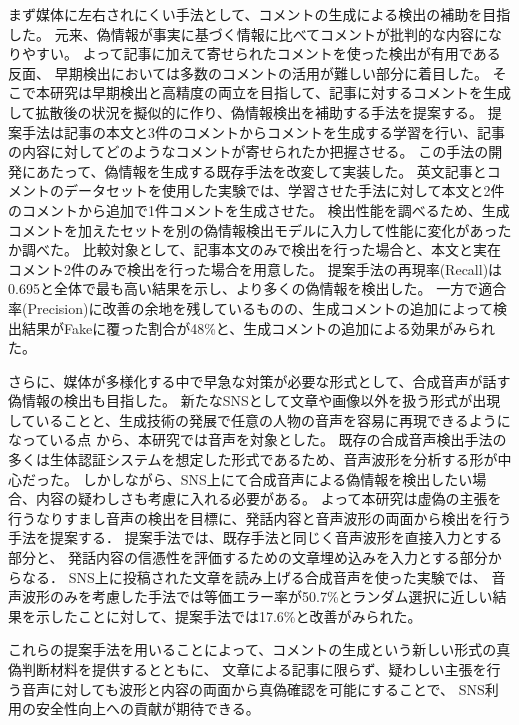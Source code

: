 まず媒体に左右されにくい手法として、コメントの生成による検出の補助を目指した。
元来、偽情報が事実に基づく情報に比べてコメントが批判的な内容になりやすい。
よって記事に加えて寄せられたコメントを使った検出が有用である反面、
早期検出においては多数のコメントの活用が難しい部分に着目した。
そこで本研究は早期検出と高精度の両立を目指して、記事に対するコメントを生成して拡散後の状況を擬似的に作り、偽情報検出を補助する手法を提案する。
提案手法は記事の本文と3件のコメントからコメントを生成する学習を行い、記事の内容に対してどのようなコメントが寄せられたか把握させる。
この手法の開発にあたって、偽情報を生成する既存手法を改変して実装した。
英文記事とコメントのデータセットを使用した実験では、学習させた手法に対して本文と2件のコメントから追加で1件コメントを生成させた。
検出性能を調べるため、生成コメントを加えたセットを別の偽情報検出モデルに入力して性能に変化があったか調べた。
比較対象として、記事本文のみで検出を行った場合と、本文と実在コメント2件のみで検出を行った場合を用意した。
提案手法の再現率(Recall)は0.695と全体で最も高い結果を示し、より多くの偽情報を検出した。
一方で適合率(Precision)に改善の余地を残しているものの、生成コメントの追加によって検出結果がFakeに覆った割合が48\%と、生成コメントの追加による効果がみられた。

さらに、媒体が多様化する中で早急な対策が必要な形式として、合成音声が話す偽情報の検出も目指した。
新たなSNSとして文章や画像以外を扱う形式が出現していることと、生成技術の発展で任意の人物の音声を容易に再現できるようになっている点
から、本研究では音声を対象とした。
既存の合成音声検出手法の多くは生体認証システムを想定した形式であるため、音声波形を分析する形が中心だった。
しかしながら、SNS上にて合成音声による偽情報を検出したい場合、内容の疑わしさも考慮に入れる必要がある。
よって本研究は虚偽の主張を行うなりすまし音声の検出を目標に、発話内容と音声波形の両面から検出を行う手法を提案する．
提案手法では、既存手法と同じく音声波形を直接入力とする部分と、
発話内容の信憑性を評価するための文章埋め込みを入力とする部分からなる．
SNS上に投稿された文章を読み上げる合成音声を使った実験では、
音声波形のみを考慮した手法では等価エラー率が50.7\%とランダム選択に近しい結果を示したことに対して、提案手法では17.6\%と改善がみられた。

これらの提案手法を用いることによって、コメントの生成という新しい形式の真偽判断材料を提供するとともに、
文章による記事に限らず、疑わしい主張を行う音声に対しても波形と内容の両面から真偽確認を可能にすることで、
SNS利用の安全性向上への貢献が期待できる。

%

\cleardoublepage